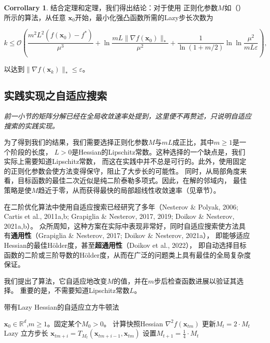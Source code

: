 \documentclass[a4paper,twoside,AutoFakeBold]{article}
\theoremstyle{definition}
\newtheorem{corr2}{{Corrollary}}[section]
\begin{document}
\begin{corr2}\label{corr:5.4}
结合定理和定理，我们得出结论：对于使用
正则化参数\(M\)如（）所示的算法，从任意
\(\mathbf{x}_0\)开始，最小化强凸函数所需的Lazy步长次数为

\[
k \leq \mathcal{O}\left( \frac{m^2 L^2 (f(\mathbf{x}_0) - f^*)}{\mu^3} + \ln \frac{m L \|\nabla f(\mathbf{x}_0)\|_*}{\mu^2} + \frac{1}{\ln(1 + m/2)} \ln \ln \frac{\mu^2}{m L \varepsilon} \right),
\]

以达到\(\|\nabla f(\mathbf{x}_k)\|_* \leq \varepsilon\)。
\end{corr2}
\newpage

\subsection{实践实现之自适应搜索}\label{sec:6}
\textsl{前一小节的矩阵分解已经在全局收敛速率处提到，这里便不再赘述，只说明自适应搜索的实践实现。}

为了得到我们的结果，我们需要选择正则化参数\(M\)与\(mL\)成正比，其中\(m \geq 1\)是一个阶段的长度，
\(L > 0\)是Hessian的Lipschitz常数。这种选择的一个缺点是，我们实际上需要知道Lipschitz常数，
而这在实践中并不总是可行的。此外，使用固定的正则化参数会使方法变得保守，阻止了大步长的可能性。
同时，从局部角度来看，目标函数的最佳二次近似是纯二阶泰勒多项式。因此，在解的邻域内，
最佳策略是使\(M\)趋近于零，从而获得最快的局部超线性收敛速率（见章节）。

在二阶优化算法中使用自适应搜索已经研究了多年（Nesterov \& Polyak, 2006; Cartis et al., 2011a,b; Grapiglia \& Nesterov, 2017, 2019; Doikov \& Nesterov, 2021a,b）。
众所周知，这种方案在实际中表现非常好，同时自适应搜索使方法具有\textbf{通用性}（Grapiglia \& Nesterov, 2017; Doikov \& Nesterov, 2021a），
即能够适应Hessian的最佳Hölder度，甚至\textbf{超通用性}（Doikov et al., 2022），
即自动选择目标函数的二阶或三阶导数的Hölder度，从而在广泛的问题类上具有最佳的全局复杂度保证。

我们提出了算法，它自适应地改变\(M\)的值，并在\(m\)步后检查函数进展以验证其选择。
重要的是，不需要知道Lipschitz常数\(L\)。

\begin{algorithm}
	\caption{带有Lazy Hessian的自适应立方牛顿法}\label{alg:3}
	\begin{algorithmic}[2]
	\REQUIRE $\mathbf{x}_0 \in \mathbb{R}^d$,$m \geq 1$。固定某个$M_0 > 0$。
			\STATE 计算快照Hessian $\nabla^2 f(\mathbf{x}_{tm})$
			\STATE 更新$M_t = 2 \cdot M_t$
				\STATE Lazy 立方步长 $\mathbf{x}_{tm + i} = T_{M_t}(\mathbf{x}_{tm + i - 1}, \mathbf{x}_{tm})$
			\ENDFOR
			\STATE 设置$M_{t+1} = \frac{1}{4} \cdot M_t$
			\ENDIF
		\ENDFOR
	\end{algorithmic}
\end{algorithm}
\end{document}
